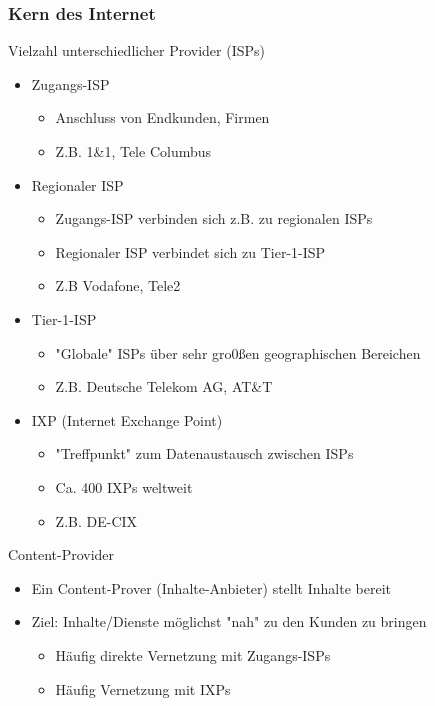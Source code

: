     \subsubsection{Kern des Internet}
      Vielzahl unterschiedlicher Provider (ISPs)
      \begin{itemize}
        \item Zugangs-ISP
          \begin{itemize}
            \item Anschluss von Endkunden, Firmen
            \item Z.B. 1\&1, Tele Columbus
          \end{itemize}
        \item Regionaler ISP
          \begin{itemize}
            \item Zugangs-ISP verbinden sich z.B. zu regionalen ISPs
            \item Regionaler ISP verbindet sich zu Tier-1-ISP
            \item Z.B Vodafone, Tele2
          \end{itemize}
        \item Tier-1-ISP
          \begin{itemize}
            \item "Globale" ISPs über sehr gro0ßen geographischen Bereichen
            \item Z.B. Deutsche Telekom AG, AT\&T
          \end{itemize}
        \item IXP (Internet Exchange Point)
          \begin{itemize}
            \item "Treffpunkt" zum Datenaustausch zwischen ISPs
            \item Ca. 400 IXPs weltweit
            \item Z.B. DE-CIX
          \end{itemize}
      \end{itemize}
      Content-Provider
      \begin{itemize}
        \item Ein Content-Prover (Inhalte-Anbieter) stellt Inhalte bereit
        \item Ziel: Inhalte/Dienste möglichst "nah" zu den Kunden zu bringen
          \begin{itemize}
            \item Häufig direkte Vernetzung mit Zugangs-ISPs
            \item Häufig Vernetzung mit IXPs
          \end{itemize}
      \end{itemize}
